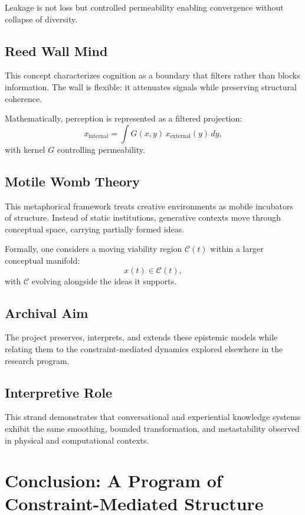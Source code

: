 \documentclass[12pt]{article}
\begin{document}
Leakage is not loss but controlled permeability enabling convergence without collapse of diversity.

\subsection{Reed Wall Mind}

This concept characterizes cognition as a boundary that filters rather than blocks information. The wall is flexible: it attenuates signals while preserving structural coherence.

Mathematically, perception is represented as a filtered projection:
\[
x_{\text{internal}} = \int G(x,y)\,x_{\text{external}}(y)\,dy,
\]
with kernel $G$ controlling permeability.

\subsection{Motile Womb Theory}

This metaphorical framework treats creative environments as mobile incubators of structure. Instead of static institutions, generative contexts move through conceptual space, carrying partially formed ideas.

Formally, one considers a moving viability region $\mathcal{C}(t)$ within a larger conceptual manifold:
\[
x(t)\in\mathcal{C}(t),
\]
with $\mathcal{C}$ evolving alongside the ideas it supports.

\subsection{Archival Aim}

The project preserves, interprets, and extends these epistemic models while relating them to the constraint-mediated dynamics explored elsewhere in the research program.

\subsection{Interpretive Role}

This strand demonstrates that conversational and experiential knowledge systems exhibit the same smoothing, bounded transformation, and metastability observed in physical and computational contexts.

\bigskip

\section{Conclusion: A Program of Constraint-Mediated Structure}
\end{document}
